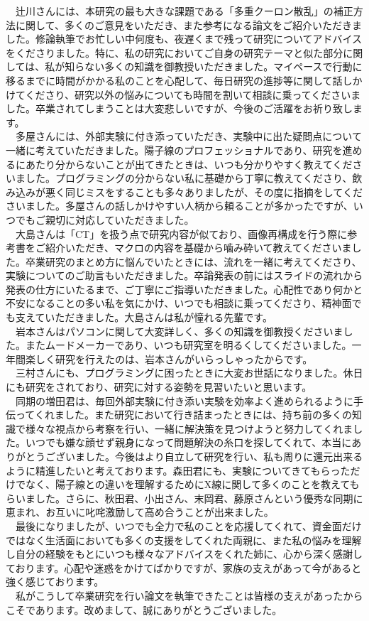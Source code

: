 \begin{acknowledgment}
　辻川さんには、本研究の最も大きな課題である「多重クーロン散乱」の補正方法に関して、多くのご意見をいただき、また参考になる論文をご紹介いただきました。修論執筆でお忙しい中何度も、夜遅くまで残って研究についてアドバイスをくださりました。特に、私の研究においてご自身の研究テーマと似た部分に関しては、私が知らない多くの知識を御教授いただきました。マイペースで行動に移るまでに時間がかかる私のことを心配して、毎日研究の進捗等に関して話しかけてくださり、研究以外の悩みについても時間を割いて相談に乗ってくださいました。卒業されてしまうことは大変悲しいですが、今後のご活躍をお祈り致します。\\
　多屋さんには、外部実験に付き添っていただき、実験中に出た疑問点について一緒に考えていただきました。陽子線のプロフェッショナルであり、研究を進めるにあたり分からないことが出てきたときは、いつも分かりやすく教えてくださいました。プログラミングの分からない私に基礎から丁寧に教えてくださり、飲み込みが悪く同じミスをすることも多々ありましたが、その度に指摘をしてくださいました。多屋さんの話しかけやすい人柄から頼ることが多かったですが、いつでもご親切に対応していただきました。\\
　大島さんは「CT」を扱う点で研究内容が似ており、画像再構成を行う際に参考書をご紹介いただき、マクロの内容を基礎から噛み砕いて教えてくださいました。卒業研究のまとめ方に悩んでいたときには、流れを一緒に考えてくださり、実験についてのご助言もいただきました。卒論発表の前にはスライドの流れから発表の仕方にいたるまで、ご丁寧にご指導いただきました。心配性であり何かと不安になることの多い私を気にかけ、いつでも相談に乗ってくださり、精神面でも支えていただきました。大島さんは私が憧れる先輩です。\\
　岩本さんはパソコンに関して大変詳しく、多くの知識を御教授くださいました。またムードメーカーであり、いつも研究室を明るくしてくださいました。一年間楽しく研究を行えたのは、岩本さんがいらっしゃったからです。\\
　三村さんにも、プログラミングに困ったときに大変お世話になりました。休日にも研究をされており、研究に対する姿勢を見習いたいと思います。\\
　同期の増田君は、毎回外部実験に付き添い実験を効率よく進められるように手伝ってくれました。また研究において行き詰まったときには、持ち前の多くの知識で様々な視点から考察を行い、一緒に解決策を見つけようと努力してくれました。いつでも嫌な顔せず親身になって問題解決の糸口を探してくれて、本当にありがとうございました。今後はより自立して研究を行い、私も周りに還元出来るように精進したいと考えております。森田君にも、実験についてきてもらっただけでなく、陽子線との違いを理解するためにX線に関して多くのことを教えてもらいました。さらに、秋田君、小出さん、末岡君、藤原さんという優秀な同期に恵まれ、お互いに叱咤激励して高め合うことが出来ました。\\
　最後になりましたが、いつでも全力で私のことを応援してくれて、資金面だけではなく生活面においても多くの支援をしてくれた両親に、また私の悩みを理解し自分の経験をもとにいつも様々なアドバイスをくれた姉に、心から深く感謝しております。心配や迷惑をかけてばかりですが、家族の支えがあって今があると強く感じております。\\
　私がこうして卒業研究を行い論文を執筆できたことは皆様の支えがあったからこそであります。改めまして、誠にありがとうございました。\\
\end{acknowledgment}
